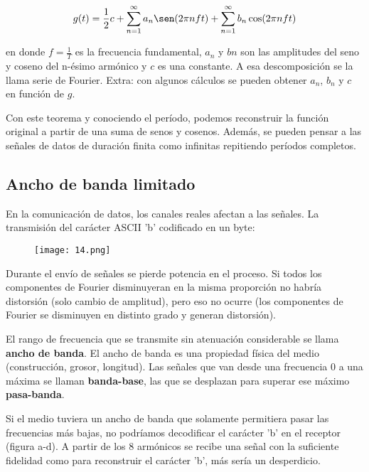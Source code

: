 \documentclass{book}
\begin{document}
	\begin{equation}
	g(t) = \frac{1}{2}c + \sum_{n = 1}^{\infty} a_{n} \sen (2\pi n f t) + \sum_{n = 1}^{\infty} b_{n} \cos (2\pi n f t)
	\end{equation}
	
	en donde $f = \frac{1}{T}$ es la frecuencia fundamental, $a_{n}$ y $b{n}$ son las amplitudes del seno y coseno del n-ésimo armónico y $c$ es una constante. A esa descomposición se la llama serie de Fourier. Extra: con algunos cálculos se pueden obtener $a_{n}$, $b_{n}$ y $c$ en función de $g$.
	
	Con este teorema y conociendo el período, podemos reconstruir la función original a partir de una suma de senos y cosenos. Además, se pueden pensar a las señales de datos de duración finita como infinitas repitiendo períodos completos.
	
	\subsection{Ancho de banda limitado}
	En la comunicación de datos, los canales reales afectan a las señales. La transmisión del carácter ASCII 'b' codificado en un byte:
	
	\begin{figure}[H]
		\centering
		\texttt{[image: 14.png]}
	\end{figure}
	
	Durante el envío de señales se pierde potencia en el proceso. Si todos los componentes de Fourier disminuyeran en la misma proporción no habría distorsión (solo cambio de amplitud), pero eso no ocurre (los componentes de Fourier se disminuyen en distinto grado y generan distorsión).
	
	\vspace{3mm}
	El rango de frecuencia que se transmite sin atenuación considerable se llama \textbf{ancho de banda}. El ancho de banda es una propiedad física del medio (construcción, grosor, longitud). Las señales que van desde una frecuencia 0 a una máxima se llaman \textbf{banda-base}, las que se desplazan para superar ese máximo \textbf{pasa-banda}.
	
	\vspace{3mm}	
	Si el medio tuviera un ancho de banda que solamente permitiera pasar las frecuencias más bajas, no podríamos decodificar el carácter 'b' en el receptor (figura a-d). A partir de los 8 armónicos se recibe una señal con la suficiente fidelidad como para reconstruir el carácter 'b', más sería un desperdicio.
	
\end{document}
